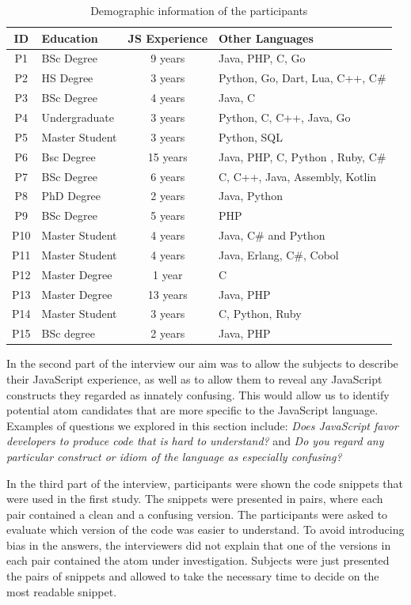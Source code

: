 \begin{table}[htb!]
  \centering
  \caption{Demographic information of the participants}
\begin{scriptsize}  
\begin{tabular}{clcl}
\toprule
ID & Education & JS Experience & Other Languages \\ \midrule 
P1 & BSc Degree & 9 years & Java, PHP, C, Go  
\\ 
P2 & HS Degree & 3 years & Python, Go, Dart, Lua, C++, C\#
\\ 
P3 & BSc Degree & 4 years & Java, C
\\ 
P4 & Undergraduate & 3 years & Python, C, C++, Java, Go
\\ 
P5 & Master Student & 3 years & Python, SQL
\\ 
P6 & Bsc Degree & 15  years  & Java, PHP, C, Python , Ruby, C\#
\\ 
P7 & BSc Degree  & 6 years & C, C++, Java, Assembly, Kotlin
\\ 
P8 & PhD Degree & 2 years & Java, Python
\\ 
P9 & BSc Degree  & 5 years & PHP
\\ 
P10 & Master Student & 4 years & Java, C\# and Python
\\ 
P11 & Master Student & 4 years & Java, Erlang, C\#, Cobol
\\ 
P12 & Master Degree & 1 year & C
\\ 
P13 & Master Degree & 13 years & Java, PHP
\\ 
P14 & Master Student & 3 years & C, Python, Ruby
\\ 
P15 &  BSc degree  & 2 years & Java, PHP
\\ \bottomrule
\end{tabular}
\end{scriptsize}
    \label{pinterview}
\end{table}

In the second part of the interview our aim was to allow the subjects to describe their JavaScript experience, as well as to allow them to reveal any JavaScript constructs they regarded as innately confusing. This would allow us to identify potential atom candidates that are more specific to the JavaScript language. Examples of questions we explored in this section include: \emph{Does JavaScript favor developers to produce code that is hard to understand?} and \emph{Do you regard any particular construct or idiom of the language as especially confusing?}

In the third part of the interview, participants were shown the code snippets that were used in the first study. The snippets were presented in pairs, where each pair contained a clean and a confusing version. The participants 
were asked to evaluate which version of the code was easier to understand. To avoid introducing bias in the answers, the interviewers did not explain that one of the versions in each pair contained the atom under investigation. Subjects were just presented the pairs of snippets and allowed to take the necessary time to decide on the most readable snippet.

